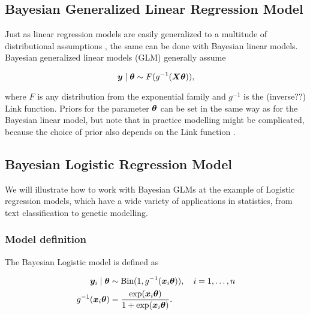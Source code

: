 \subsection{Bayesian Generalized Linear Regression Model}\label{sec:logit-glm}

Just as linear regression models are easily generalized to a multitude of distributional assumptions \citep{nelder_generalized_1972}, the same can be done with Bayesian linear models. 
Bayesian generalized linear models (GLM)  generally assume

\begin{equation*}
        \bm{y} \mid \bm{\theta} \sim F(g^{-1}(\bm{X} \bm{\theta})),
\end{equation*}

where $F$ is any distribution from the exponential family and $g^{-1}$ is the (inverse??) Link function.
Priors for the parameter $\bm{\theta}$ can be set in the same way as for the Bayesian linear model, but note that in practice modelling might be complicated, because the choice of prior also depends on the Link function \citep{west_dynamic_1985}.


\subsection{Bayesian Logistic Regression Model} \label{sec:logit-logit}

We will illustrate how to work with Bayesian GLMs at the example of Logistic regression models, which have a wide variety of applications in statistics, from text classification to genetic modelling.

\subsubsection*{Model definition}

The Bayesian Logistic model is defined as

\begin{equation}\label{eq:logit}
    \begin{aligned}
        \bm{y}_i \mid \bm{\theta} &\sim \text{Bin}(1, g^{-1}(\bm{x}_i \bm{\theta})), \quad i = 1, \dots, n \\
        g^{-1}(\bm{x}_i \bm{\theta}) &= \frac{\exp(\bm{x}_i \bm{\theta})}{1 + \exp(\bm{x}_i \bm{\theta})}.
    \end{aligned}
\end{equation}

